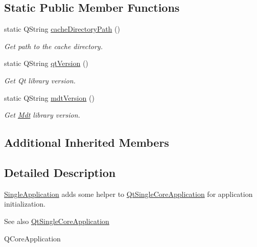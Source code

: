 \subsection*{Static Public Member Functions}
\begin{DoxyCompactItemize}
\item 
static Q\+String \hyperlink{class_mdt_1_1_single_application_a4f3aae54824f81697a17e7b1e173feec}{cache\+Directory\+Path} ()
\begin{DoxyCompactList}\small\item\em Get path to the cache directory. \end{DoxyCompactList}\item 
static Q\+String \hyperlink{class_mdt_1_1_single_application_a0f66bbb8cadc93f8185d3d4c92e3685e}{qt\+Version} ()\hypertarget{class_mdt_1_1_single_application_a0f66bbb8cadc93f8185d3d4c92e3685e}{}\label{class_mdt_1_1_single_application_a0f66bbb8cadc93f8185d3d4c92e3685e}

\begin{DoxyCompactList}\small\item\em Get Qt library version. \end{DoxyCompactList}\item 
static Q\+String \hyperlink{class_mdt_1_1_single_application_a9b31e7b78f87a9aa37ffadaf893b0cec}{mdt\+Version} ()\hypertarget{class_mdt_1_1_single_application_a9b31e7b78f87a9aa37ffadaf893b0cec}{}\label{class_mdt_1_1_single_application_a9b31e7b78f87a9aa37ffadaf893b0cec}

\begin{DoxyCompactList}\small\item\em Get \hyperlink{namespace_mdt}{Mdt} library version. \end{DoxyCompactList}\end{DoxyCompactItemize}
\subsection*{Additional Inherited Members}


\subsection{Detailed Description}
\hyperlink{class_mdt_1_1_single_application}{Single\+Application} adds some helper to \hyperlink{class_qt_single_core_application}{Qt\+Single\+Core\+Application} for application initialization. 

\begin{DoxySeeAlso}{See also}
\hyperlink{class_qt_single_core_application}{Qt\+Single\+Core\+Application} 

Q\+Core\+Application 
\end{DoxySeeAlso}


